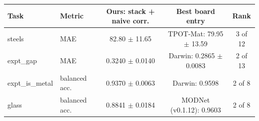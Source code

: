 \begin{tabular}{llccc}
\toprule
Task & Metric & Ours: stack + naive corr. & Best board entry & Rank \\
\midrule
steels & MAE & 82.80 $\pm$ 11.65 & TPOT-Mat: 79.95 $\pm$ 13.59 & 3 of 12 \\
expt\_gap & MAE & 0.3240 $\pm$ 0.0140 & Darwin: 0.2865 $\pm$ 0.0083 & 2 of 13 \\
expt\_is\_metal & balanced acc. & 0.9370 $\pm$ 0.0063 & Darwin: 0.9598 & 2 of 8 \\
glass & balanced acc. & 0.8841 $\pm$ 0.0184 & MODNet (v0.1.12): 0.9603 & 2 of 8 \\
\bottomrule
\end{tabular}
